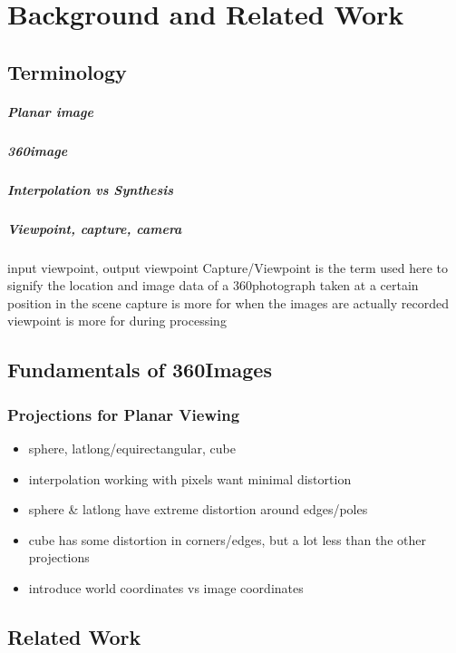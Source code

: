 \chapter{Background and Related Work}

\section{Terminology}

\paragraph{Planar image}
\paragraph{360\degree image}
\paragraph{Interpolation vs Synthesis}
\paragraph{Viewpoint, capture, camera} input viewpoint, output viewpoint
Capture/Viewpoint is the term used here to signify the location and image data of a 360\degree photograph taken at a certain position in the scene
capture is more for when the images are actually recorded
viewpoint is more for during processing

\section{Fundamentals of 360\degree Images}

\subsection{Projections for Planar Viewing \label{projections}}
\begin{itemize}
    \item sphere, latlong/equirectangular, cube
    \item interpolation \ar working with pixels \ar want minimal distortion
    \item sphere \& latlong have extreme distortion around edges/poles
    \item cube has some distortion in corners/edges, but a lot less than the other projections
    \item introduce world coordinates vs image coordinates
\end{itemize}

\section{Related Work}
